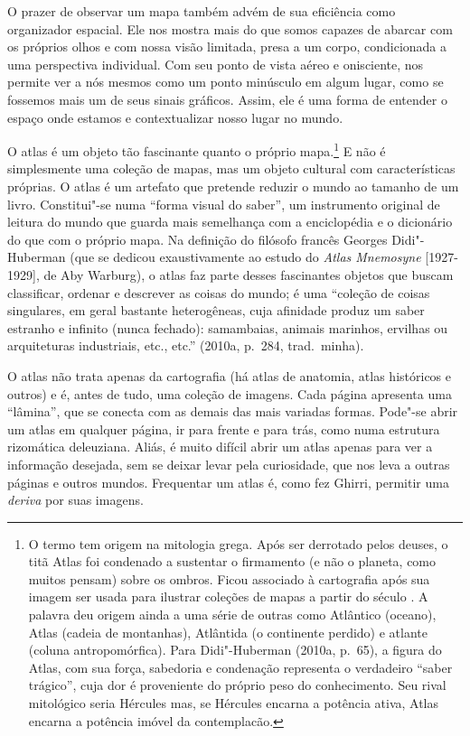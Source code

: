 O prazer de observar um mapa também advém de sua eficiência como
organizador espacial. Ele nos mostra mais do que somos capazes de
abarcar com os próprios olhos e com nossa visão limitada, presa a um
corpo, condicionada a uma perspectiva individual. Com seu ponto de vista
aéreo e onisciente, nos permite ver a nós mesmos como um ponto minúsculo
em algum lugar, como se fossemos mais um de seus sinais gráficos. Assim,
ele é uma forma de entender o espaço onde estamos e contextualizar nosso
lugar no mundo.

O atlas é um objeto tão fascinante quanto o próprio mapa.\footnote{O
  termo tem origem na mitologia grega. Após ser derrotado pelos deuses,
  o titã Atlas foi condenado a sustentar o firmamento (e não o planeta,
  como muitos pensam) sobre os ombros. Ficou associado à cartografia
  após sua imagem ser usada para ilustrar coleções de mapas a partir do
  século . A palavra deu origem ainda a uma série de outras como
  Atlântico (oceano), Atlas (cadeia de montanhas), Atlântida (o continente
  perdido) e atlante (coluna antropomórfica). Para Didi"-Huberman (2010a,
  p.~65), a figura do Atlas, com sua força, sabedoria e condenação
  representa o verdadeiro ``saber trágico'', cuja dor é proveniente do
  próprio peso do conhecimento. Seu rival mitológico seria Hércules mas,
  se Hércules encarna a potência ativa, Atlas encarna a potência imóvel
  da contemplacão.} E não é simplesmente uma coleção de mapas, mas um
objeto cultural com características próprias. O atlas é um artefato que
pretende reduzir o mundo ao tamanho de um livro. Constitui"-se numa
``forma visual do saber'', um instrumento original de leitura do mundo
que guarda mais semelhança com a enciclopédia e o dicionário do que com
o próprio mapa. Na definição do filósofo francês Georges Didi"-Huberman
(que se dedicou exaustivamente ao estudo do \emph{Atlas Mnemosyne}
{[}1927-1929{]}, de Aby Warburg), o atlas faz parte desses fascinantes
objetos que buscam classificar, ordenar e descrever as coisas do mundo;
é uma ``coleção de coisas singulares, em geral bastante heterogêneas,
cuja afinidade produz um saber estranho e infinito (nunca fechado):
samambaias, animais marinhos, ervilhas ou arquiteturas industriais,
etc., etc.'' (2010a, p.~284, trad.~minha).

O atlas não trata apenas da cartografia (há atlas de anatomia, atlas
históricos e outros) e é, antes de tudo, uma coleção de imagens. Cada
página apresenta uma ``lâmina'', que se conecta com as demais das mais
variadas formas. Pode"-se abrir um atlas em qualquer página, ir para
frente e para trás, como numa estrutura rizomática deleuziana. Aliás, é
muito difícil abrir um atlas apenas para ver a informação desejada, sem
se deixar levar pela curiosidade, que nos leva a outras páginas e outros
mundos. Frequentar um atlas é, como fez Ghirri, permitir uma
\emph{deriva} por suas imagens.

